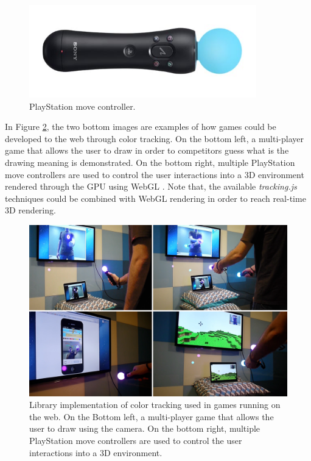 \begin{figure}[!htb]
  \centering
  \includegraphics[width=280pt]{chapters/evaluation/psmove.png}
  \caption{PlayStation move controller.}
  \label{figure:psmove}
\end{figure}

In Figure \ref{figure:color_games}, the two bottom images are examples of how games could be developed to the web through color tracking. On the bottom left, a multi-player game that allows the user to draw in order to competitors guess what is the drawing meaning is demonstrated. On the bottom right, multiple PlayStation move controllers are used to control the user interactions into a 3D environment rendered through the GPU using WebGL \cite{WebGL2013}. Note that, the available \textit{tracking.js} techniques could be combined with WebGL rendering in order to reach real-time 3D rendering.

\begin{figure}[!htb]
  \centering
  \includegraphics[width=\linewidth]{chapters/evaluation/color_games.png}
  \caption{Library implementation of color tracking used in games running on the web. On the Bottom left, a multi-player game that allows the user to draw using the camera. On the bottom right, multiple PlayStation move controllers are used to control the user interactions into a 3D environment.}
  \label{figure:color_games}
\end{figure}

